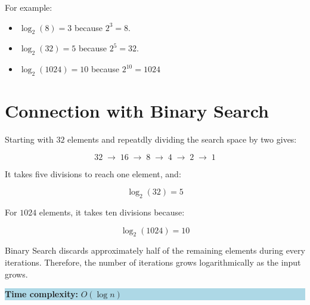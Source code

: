 \documentclass[12pt, a4paper]{article}
\begin{document}
For example:

\begin{itemize}[leftmargin=*]
    \item $\log_2(8)=3$ because $2^3=8$.
    \item $\log_2(32)=5$ because $2^5=32$.
    \item $\log_2(1024)=10$ because $2^{10}=1024$
\end{itemize}

\section*{Connection with Binary Search}

Starting with $32$ elements and repeatdly dividing the search space by two gives: 

\[
    32 \;\longrightarrow\; 16 \;\longrightarrow\; 8
    \;\longrightarrow\; 4 \;\longrightarrow\; 2 \;\longrightarrow\; 1
\]

It takes five divisions to reach one element, and: 

\[
    \log_2(32)=5
\]

For $1024$ elements, it takes ten divisions because:

\[
    \log_2(1024)=10
\]


Binary Search discards approximately half of the remaining elements during every iterations. Therefore,
the number of iterations grows logarithmically as the input grows.

\begin{center}
    \colorbox{lightblue}{\parbox{0.75\textwidth}{
        \centering
        \textbf{Time complexity:} \(O(\log n)\)
    }}

\end{center}
\end{document}
